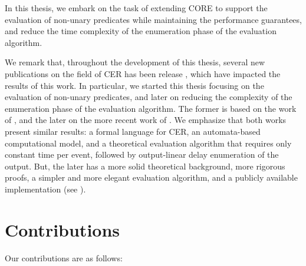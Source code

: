 In this thesis, we embark on the task of extending CORE to support the evaluation of non-unary predicates while maintaining the performance guarantees, and reduce the time complexity of the enumeration phase of the evaluation algorithm.

We remark that, throughout the development of this thesis, several new publications on the field of CER has been release \cite{formal-framework-cer, core}, which have impacted the results of this work. In particular, we started this thesis focusing on the evaluation of non-unary predicates, and later on reducing the complexity of the enumeration phase of the evaluation algorithm. The former is based on the work of \cite{formal-framework-cep, on-the-expressiveness}, and the later on the more recent work of \cite{formal-framework-cer, core}. We emphasize that both works present similar results: a formal language for CER, an automata-based computational model, and a theoretical evaluation algorithm that requires only constant time per event, followed by output-linear delay enumeration of the output. But, the later has a more solid theoretical background, more rigorous proofs, a simpler and more elegant evaluation algorithm, and a publicly available implementation (see \cite{core-repo}).

\section{Contributions}
\label{sec:contribution}

Our contributions are as follows:

